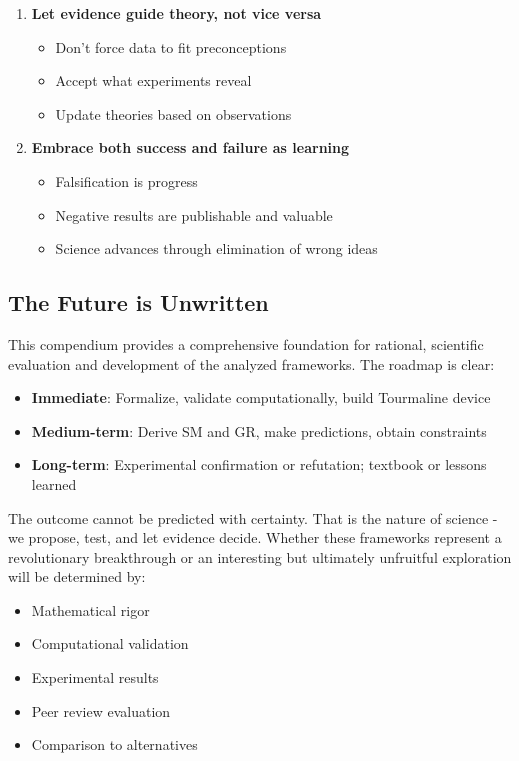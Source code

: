 \begin{enumerate}
    \item \textbf{Let evidence guide theory, not vice versa}
    \begin{itemize}
        \item Don't force data to fit preconceptions
        \item Accept what experiments reveal
        \item Update theories based on observations
    \end{itemize}

    \item \textbf{Embrace both success and failure as learning}
    \begin{itemize}
        \item Falsification is progress
        \item Negative results are publishable and valuable
        \item Science advances through elimination of wrong ideas
    \end{itemize}
\end{enumerate}

\subsection{The Future is Unwritten}

This compendium provides a comprehensive foundation for rational, scientific evaluation and development of the analyzed frameworks. The roadmap is clear:

\begin{itemize}
    \item \textbf{Immediate}: Formalize, validate computationally, build Tourmaline device
    \item \textbf{Medium-term}: Derive SM and GR, make predictions, obtain constraints
    \item \textbf{Long-term}: Experimental confirmation or refutation; textbook or lessons learned
\end{itemize}

The outcome cannot be predicted with certainty. That is the nature of science - we propose, test, and let evidence decide. Whether these frameworks represent a revolutionary breakthrough or an interesting but ultimately unfruitful exploration will be determined by:

\begin{itemize}
    \item Mathematical rigor
    \item Computational validation
    \item Experimental results
    \item Peer review evaluation
    \item Comparison to alternatives
\end{itemize}

